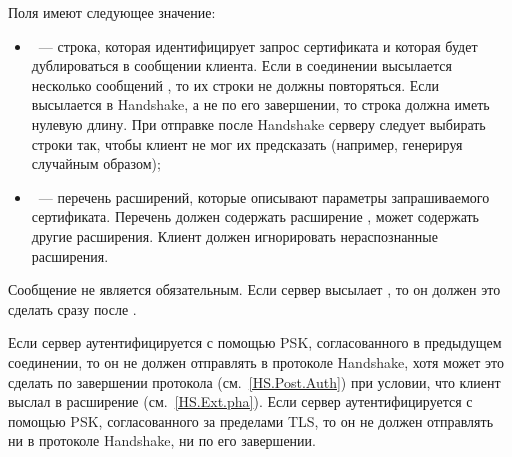 Поля  имеют следующее значение:

\begin{itemize}
\item
{}~--- строка, которая 
идентифицирует запрос сертификата и которая будет дублироваться в сообщении  
 клиента.
%
Если в соединении высылается несколько сообщений ,
то их строки  не должны повторяться.
%
Если  высылается в Handshake, а не по его завершении,
то строка должна иметь нулевую длину.
%
При отправке  после Handshake серверу следует выбирать 
строки так, чтобы клиент не мог их предсказать (например, генерируя случайным 
образом);


\item
{}~--- перечень расширений, которые описывают параметры 
запрашиваемого сертификата. Перечень должен содержать расширение
, может содержать другие расширения.
%
Клиент должен игнорировать нераспознанные расширения.
\end{itemize}

Сообщение  не является обязательным. Если сервер 
высылает , то он должен это сделать сразу после 
.


Если сервер аутентифицируется с помощью PSK, согласованного в предыдущем 
соединении, то он не должен отправлять  в протоколе 
Handshake, хотя может это сделать по завершении протокола
(см.~\ref{HS.Post.Auth}) при условии, что клиент выслал в
 расширение 
(см.~\ref{HS.Ext.pha}).
%
Если сервер аутентифицируется с помощью PSK, согласованного за пределами TLS, 
то он не должен отправлять  ни в протоколе Handshake, 
ни по его завершении.

